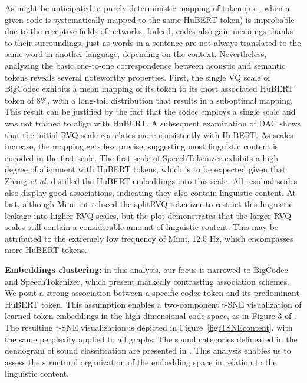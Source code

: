 \documentclass{Interspeech}
\begin{document}
As might be anticipated, a purely deterministic mapping of token (\textit{i.e}., when a given code is systematically mapped to the same HuBERT token) is improbable due to the receptive fields of networks. Indeed, codes also gain meanings thanks to their surroundings, just as words in a sentence are not always translated to the same word in another language, depending on the context. Nevertheless, analyzing the basic one-to-one correspondence between acoustic and semantic tokens reveals several noteworthy properties. First, the single VQ scale of BigCodec exhibits a mean mapping of its token to its most associated HuBERT token of 8\%, with a long-tail distribution that results in a suboptimal mapping. This result can be justified by the fact that the codec employs a single scale and was not trained to align with HuBERT. A subsequent examination of DAC shows that the initial RVQ scale correlates more consistently with HuBERT. As scales increase, the mapping gets less precise, suggesting most linguistic content is encoded in the first scale. The first scale of SpeechTokenizer exhibits a high degree of alignment with HuBERT tokens, which is to be expected given that Zhang \emph{et al.} \cite{zhang2023speechtokenizer} distilled the HuBERT embeddings into this scale. All residual scales also display good associations, indicating they also contain linguistic content. At last, although Mimi introduced the splitRVQ tokenizer to restrict this linguistic leakage into higher RVQ scales, but the plot demonstrates that the larger RVQ scales still contain a considerable amount of linguistic content. This may be attributed to the extremely low frequency of Mimi, 12.5 Hz, which encompasses more HuBERT tokens.

\noindent\textbf{Embeddings clustering:} in this analysis, our focus is narrowed to BigCodec and SpeechTokenizer, which present markedly contrasting association schemes. We posit a strong association between a specific codec token and its predominant HuBERT token. This assumption enables a two-component t-SNE \cite{van2008visualizing} visualization of learned token embeddings in the high-dimensional code space, as in Figure 3 of \cite{poli2024modeling}. The resulting t-SNE visualization is depicted in Figure~\ref{fig:TSNEcontent}, with the same perplexity applied to all graphs. The sound categories delineated in the dendogram of sound classification are presented in \cite{van2023rhythm}. This analysis enables us to assess the structural organization of the embedding space in relation to the linguistic content.
\end{document}
